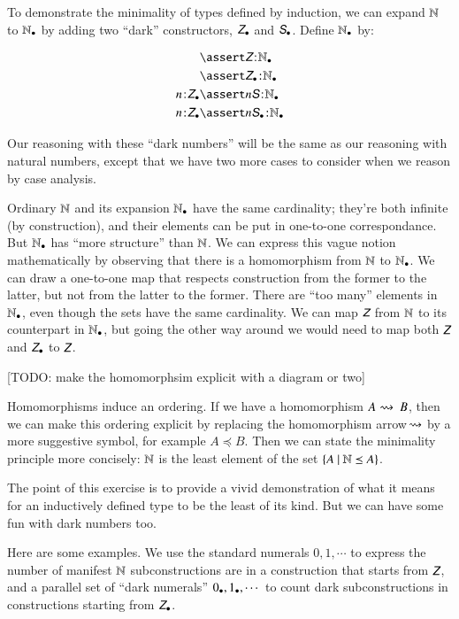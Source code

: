 \documentclass{article}
\begin{document}
To demonstrate the minimality of types defined by induction, we can
expand \(\mathbb{N}\) to \(\mathbb{N}_{\bullet}\) by adding two ``dark'' constructors,
\(\ZDark\) and \(\SDark\). Define \(\mathbb{N}_{\bullet}\) by:

\begin{align}
  & \linfer \tj{\ZNat}{\NDark} \\
  & \linfer \tj{\ZDark}{\NDark} \\
  \tj{n}{\ZDark} & \linfer \tj{n\SNat}{\NDark} \\
  \tj{n}{\ZDark} & \linfer \tj{n\SDark}{\NDark} \\
\end{align}

Our reasoning with these ``dark numbers'' will be the same as our
reasoning with natural numbers, except that we have two more cases to
consider when we reason by case analysis.

Ordinary \(\mathbb{N}\) and its expansion \(\mathbb{N}_{\bullet}\) have the same
cardinality; they're both infinite (by construction), and their
elements can be put in one-to-one correspondance. But \(\mathbb{N}_{\bullet}\) has
``more structure'' than \(\mathbb{N}\). We can express this vague notion
mathematically by observing that there is a homomorphism from \(\mathbb{N}\)
to \(\mathbb{N}_{\bullet}\). We can draw a one-to-one map that respects construction
from the former to the latter, but not from the latter to the former.
There are ``too many'' elements in \(\mathbb{N}_{\bullet}\), even though the sets
have the same cardinality. We can map \(\ZNat\) from \(\mathbb{N}\) to its
counterpart in \(\mathbb{N}_{\bullet}\), but going the other way around we would
need to map both \(\ZNat\) and \(\ZDark\) to \(\ZNat\).

[TODO: make the homomorphsim explicit with a diagram or two]

Homomorphisms induce an ordering. If we have a homomorphism \(A~\hspace{-2pt}\rightsquigarrow~B\), then we can make this ordering explicit by replacing the
homomorphism arrow \(\hspace{-2pt}\rightsquigarrow\) by a more suggestive symbol, for
example \(A\preceq B\). Then we can state the minimality principle
more concisely: \(\mathbb{N}\) is the least element of the set \(\{A\ |\
  \mathbb{N}\preceq A\}\).

The point of this exercise is to provide a vivid demonstration of what
it means for an inductively defined type to be the least of its kind.
But we can have some fun with dark numbers too.

Here are some examples. We use the standard numerals \(0, 1,\cdots\)
to express the number of manifest \(\mathbb{N}\) subconstructions are in a
construction that starts from \(\ZNat\), and a parallel set of ``dark
numerals'' \(0_{\bullet}, 1_{\bullet}, \cdots\) to count dark
subconstructions in constructions starting from \(\ZDark\).
\end{document}

